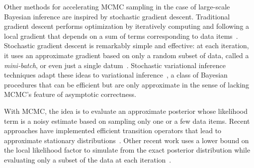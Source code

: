 \documentclass[angelino.tex]{subfiles}
\begin{document}
Other methods for accelerating MCMC sampling in the case of large-scale
Bayesian inference are inspired by stochastic gradient descent.
Traditional gradient descent performs optimization by iteratively
computing and following a local gradient that depends on a sum of terms
corresponding to data items~\citep{optimization:1983-book}.
Stochastic gradient descent is remarkably simple and effective:
at each iteration, it uses an approximate gradient based on only a
random subset of data, called a \emph{mini-batch}, or even just a single 
datum~\citep{murata:1998-statistical}.
Stochastic variational inference techniques adapt these ideas to 
variational inference~\citep{hoffman:2013-svi}, a class of Bayesian 
procedures that can be efficient but are only approximate in the sense of
lacking MCMC's feature of asymptotic correctness.

With MCMC, the idea is to evaluate an approximate posterior whose likelihood
term is a noisy estimate based on sampling only one or a few data items.
Recent approaches have implemented efficient transition operators that
lead to approximate stationary distributions~\citep{welling-2011-langevin,welling-2012-fisher,korattikara-2014-austerity,bardenet:2014-subsampling,doucet-2014-likelihood-estimator}.
Other recent work uses a lower bound on the local likelihood factor to simulate
from the exact posterior distribution while evaluating only a subset of the data
at each iteration~\citep{maclaurin-2014-firefly}.



%
\end{document}
